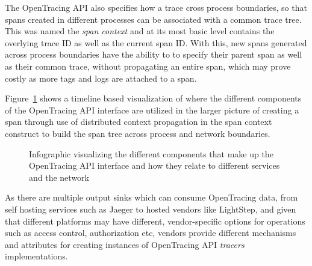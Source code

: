 \documentclass[12pt,pdftex,titlepage]{report}
\begin{document}
                The OpenTracing API also specifies how a trace cross process boundaries, so that spans created in different processes can be
                associated with a common trace tree. This was named the \textit{span context} and at its most basic level contains the 
                overlying trace ID as well as the current span ID. With this, new spans generated across process boundaries have the ability to
                to specify their parent span as well as their common trace, without propagating an entire span, which may prove costly as more
                tags and logs are attached to a span.

                Figure~\ref{fig:opentracing} shows a timeline based visualization of where the different components of the OpenTracing API interface are utilized in
                the larger picture of creating a span through use of distributed context propagation in the span context construct to build the span tree across
                process and network boundaries.
                
                \begin{figure}[hbt!]
                    \centering
                    \caption{Infographic visualizing the different components that make up the OpenTracing API interface and how they relate to different services
                    and the network}
                    \label{fig:opentracing}
                \end{figure}

                As there are multiple output sinks which can consume OpenTracing data, from self hosting services such as Jaeger to hosted vendors like LightStep, and given that
                different platforms may have different, vendor-specific options for operations such as access control, authorization etc, vendors provide different mechanisms
                and attributes for creating instances of OpenTracing API \textit{tracers} implementations.
\end{document}

